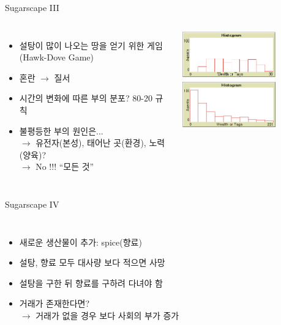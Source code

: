 \documentclass[final]{beamer}
\begin{document}
\begin{frame}[t]{Sugarscape III}
	\begin{columns}[c]
	\column{17em}
	\begin{itemize}
		\item 설탕이 많이 나오는 땅을 얻기 위한 게임(Hawk-Dove Game)
		\item 혼란 $\rightarrow$ 질서
		\item 시간의 변화에 따른 부의 분포? 80-20 규칙
		\item 불평등한 부의 원인은... 
		\\ $\rightarrow$ 유전자(본성), 태어난 곳(환경), 노력(양육)? 
		\\ $\rightarrow$ No !!!  “모든 것”
	\end{itemize}
	\column{12em}
	\includegraphics[width=11em]{wealth_histogram01.png} 
	\vspace{3em}
	\includegraphics[width=11em]{wealth_histogram02.png}
	\end{columns}
\end{frame}

\begin{frame}[t]{Sugarscape IV}
	\begin{columns}[c]
	\column{16em}
	\begin{itemize}
		\item 새로운 생산물이 추가: spice(향료)
		\item 설탕, 향료 모두 대사량 보다 적으면 사망
		\item 설탕을 구한 뒤 향료를 구하려 다녀야 함
		\item 거래가 존재한다면? \\
		$\rightarrow$ 거래가 없을 경우 보다 사회의 부가 증가 
	\end{itemize}
	\column{12em}
	\end{columns}
\end{frame}
\end{document}
